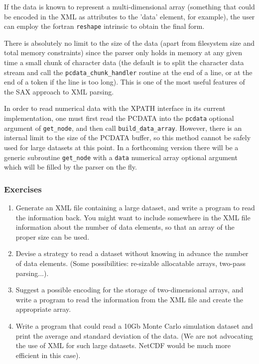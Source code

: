 \documentclass[11pt]{article}
\begin{document}
If the data is known to represent a multi-dimensional array (something
that could be encoded in the XML as attributes to the 'data' element,
for example), the user can employ the fortran \texttt{reshape}
intrinsic to obtain the final form.

There is absolutely no limit to the size of the data (apart from
filesystem size and total memory constraints) since the parser only
holds in memory at any given time a small chunk of character data (the
default is to split the character data stream and call the
\texttt{pcdata\_chunk\_handler} routine at the end of a line, or at
the end of a token if the line is too long). This is one of the most
useful features of the SAX approach to XML parsing.

In order to read numerical data with the XPATH interface in its
current implementation, one must first read the PCDATA into the
\texttt{pcdata} optional argument of \texttt{get\_node}, and then call
\texttt{build\_data\_array}. However, there is an internal limit to
the size of the PCDATA buffer, so this method cannot be safely used
for large datasets at this point. In a forthcoming version there will
be a generic subroutine \texttt{get\_node} with a \texttt{data}
numerical array optional argument which will be filled by the parser
on the fly.




\subsubsection{Exercises}
\begin{enumerate}
\item Generate an XML file containing a large dataset, and write a
program to read the information back. You might want to include
somewhere in the XML file information about the number of data
elements, so that an array of the proper size can be used.
\item Devise a strategy to read a dataset without knowing in advance
the number of data elements. (Some possibilities: re-sizable
allocatable arrays, two-pass parsing...).
\item Suggest a possible encoding for the storage of two-dimensional
arrays, and write a program to read the information from the XML file
and create the appropriate array.
\item Write a program that could read a 10Gb Monte Carlo simulation
dataset and print the average and standard deviation of the data. (We
are not advocating the use of XML for such large datasets. NetCDF
would be much more efficient in this case).
\end{enumerate}
\end{document}

